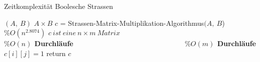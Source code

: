 \documentclass{beamer}
\begin{document}
	\begin{frame}{Zeitkomplexität Boolesche Strassen}
		\begin{algorithm}[H]
			\caption[Boolean-Strassen]{Boolean-Strassen}
			\label{algorithm20}
			\begin{algorithmic}[1]
				\Require $(A, \ B)$
				\Ensure $A \times B$
				\State $c$ = Strassen-Matrix-Multiplikation-Algorithmus$(A ,\ B$) \textbf{$ \%O(n^{2.8074})$}
				\State $c \ ist \ eine \ n \times m \ Matrix$
				 \ \ \ \ \ \ \ \ \ \ \ \ \ \ \ \ \ \ \ \ \ \ \ \ \ \ \ \ \ \ \ \ \ \ \ \ \ \textbf{$ \%O(n)$ Durchläufe}
				 \ \ \ \ \ \ \ \ \ \ \ \ \ \ \ \ \ \ \ \ \ \ \ \ \ \ \ \ \ \ \ \textbf{$ \%O(m)$ Durchläufe}
				\State $c[i][j] = 1$
				\EndIf
				\EndFor
				\EndFor
				\State return $c$
			\end{algorithmic}
		\end{algorithm}
	\end{frame}

\end{document}
